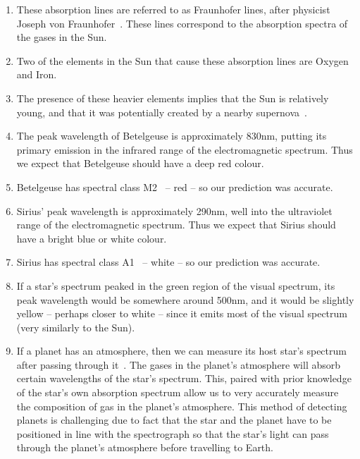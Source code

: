 \documentclass[11pt]{article}
\begin{document}
\begin{enumerate}[label={\textbf{\emph{(\arabic*)}}}]
	\item %
These absorption lines are referred to as Fraunhofer lines, after physicist Joseph von Fraunhofer~\cite{britannica-fraunhofer}.
These lines correspond to the absorption spectra of the gases in the Sun.

	\item %
Two of the elements in the Sun that cause these absorption lines are Oxygen and Iron.

	\item %
The presence of these heavier elements implies that the Sun is relatively young, and that it was potentially created by a nearby supernova~\cite{spacecom}.

	\item %
The peak wavelength of Betelgeuse is approximately 830nm, putting its primary emission in the infrared range of the electromagnetic spectrum.
Thus we expect that Betelgeuse should have a deep red colour.

	\item %
Betelgeuse has spectral class M2~\cite{stellardb-betelgeuse} -- red -- so our prediction was accurate.

	\item %
Sirius' peak wavelength is approximately 290nm, well into the ultraviolet range of the electromagnetic spectrum.
Thus we expect that Sirius should have a bright blue or white colour.

	\item %
Sirius has spectral class A1~\cite{stellardb-sirius} -- white -- so our prediction was accurate.

	\item %
If a star's spectrum peaked in the green region of the visual spectrum, its peak wavelength would be somewhere around 500nm, and it would be slightly yellow -- perhaps closer to white -- since it emits most of the visual spectrum (very similarly to the Sun).

	\item %
If a planet has an atmosphere, then we can measure its host star's spectrum after passing through it~\cite{phys-atmosphere-spec}.
The gases in the planet's atmosphere will absorb certain wavelengths of the star's spectrum.
This, paired with prior knowledge of the star's own absorption spectrum allow us to very accurately measure the composition of gas in the planet's atmosphere.
This method of detecting planets is challenging due to fact that the star and the planet have to be positioned in line with the spectrograph so that the star's light can pass through the planet's atmosphere before travelling to Earth.


\end{enumerate}
\end{document}
